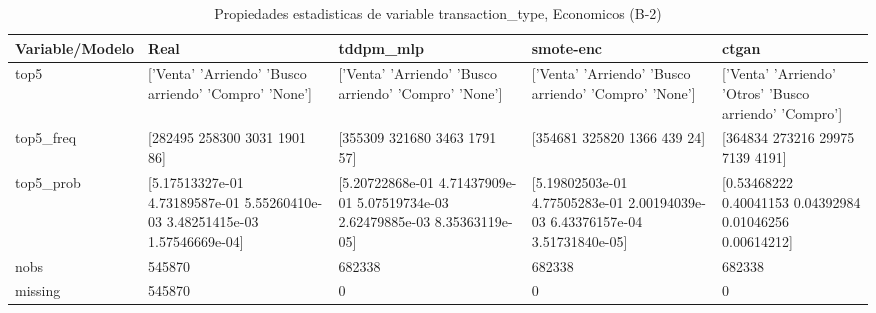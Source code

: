 \begin{table}[H]
\centering
\fontsize{8}{14}\selectfont
\caption{Propiedades  estadisticas de variable transaction\_type, Economicos (B-2)}
\label{table-stats-economicos-b-2-transaction_type}
\begin{tabular}{|l|m{10em}|m{10em}|m{10em}|m{10em}|}
\hline
 \rowcolor[gray]{0.8}
Variable/Modelo & Real & tddpm\_mlp & smote-enc & ctgan \\
\hline top5 & ['Venta' 'Arriendo' 'Busco arriendo' 'Compro' 'None'] & ['Venta' 'Arriendo' 'Busco arriendo' 'Compro' 'None'] & ['Venta' 'Arriendo' 'Busco arriendo' 'Compro' 'None'] & ['Venta' 'Arriendo' 'Otros' 'Busco arriendo' 'Compro'] \\
\hline top5\_freq & [282495 258300   3031   1901     86] & [355309 321680   3463   1791     57] & [354681 325820   1366    439     24] & [364834 273216  29975   7139   4191] \\
\hline top5\_prob & [5.17513327e-01 4.73189587e-01 5.55260410e-03 3.48251415e-03
 1.57546669e-04] & [5.20722868e-01 4.71437909e-01 5.07519734e-03 2.62479885e-03
 8.35363119e-05] & [5.19802503e-01 4.77505283e-01 2.00194039e-03 6.43376157e-04
 3.51731840e-05] & [0.53468222 0.40041153 0.04392984 0.01046256 0.00614212] \\
\hline nobs & 545870 & 682338 & 682338 & 682338 \\
\hline missing & 545870 & 0 & 0 & 0 \\
\hline
\end{tabular}
\end{table}
